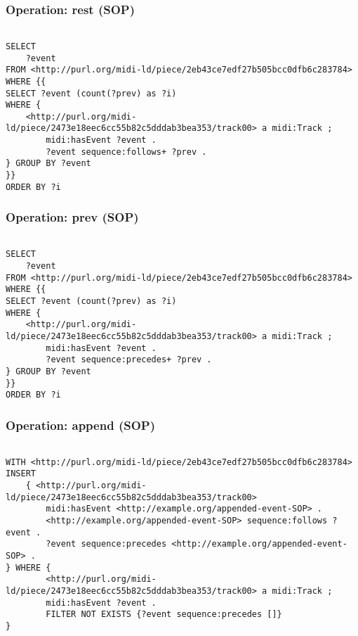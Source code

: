 \subsubsection{Operation: rest (SOP)}
\label{query:SOP:rest}

\begin{lstlisting}[language=sparql]

SELECT
	?event
FROM <http://purl.org/midi-ld/piece/2eb43ce7edf27b505bcc0dfb6c283784>
WHERE {{
SELECT ?event (count(?prev) as ?i)
WHERE {
	<http://purl.org/midi-ld/piece/2473e18eec6cc55b82c5dddab3bea353/track00> a midi:Track ;
		midi:hasEvent ?event .
		?event sequence:follows+ ?prev .
} GROUP BY ?event
}}
ORDER BY ?i

\end{lstlisting}

\subsubsection{Operation: prev (SOP)}
\label{query:SOP:prev}

\begin{lstlisting}[language=sparql]

SELECT
	?event
FROM <http://purl.org/midi-ld/piece/2eb43ce7edf27b505bcc0dfb6c283784>
WHERE {{
SELECT ?event (count(?prev) as ?i)
WHERE {
	<http://purl.org/midi-ld/piece/2473e18eec6cc55b82c5dddab3bea353/track00> a midi:Track ;
		midi:hasEvent ?event .
		?event sequence:precedes+ ?prev .
} GROUP BY ?event
}}
ORDER BY ?i

\end{lstlisting}

\subsubsection{Operation: append (SOP)}
\label{query:SOP:append}

\begin{lstlisting}[language=sparql]

WITH <http://purl.org/midi-ld/piece/2eb43ce7edf27b505bcc0dfb6c283784>
INSERT
	{ <http://purl.org/midi-ld/piece/2473e18eec6cc55b82c5dddab3bea353/track00>
		midi:hasEvent <http://example.org/appended-event-SOP> .
		<http://example.org/appended-event-SOP> sequence:follows ?event .
		?event sequence:precedes <http://example.org/appended-event-SOP> .
} WHERE	{  
		<http://purl.org/midi-ld/piece/2473e18eec6cc55b82c5dddab3bea353/track00> a midi:Track ;
		midi:hasEvent ?event .
		FILTER NOT EXISTS {?event sequence:precedes []}
}

\end{lstlisting}

